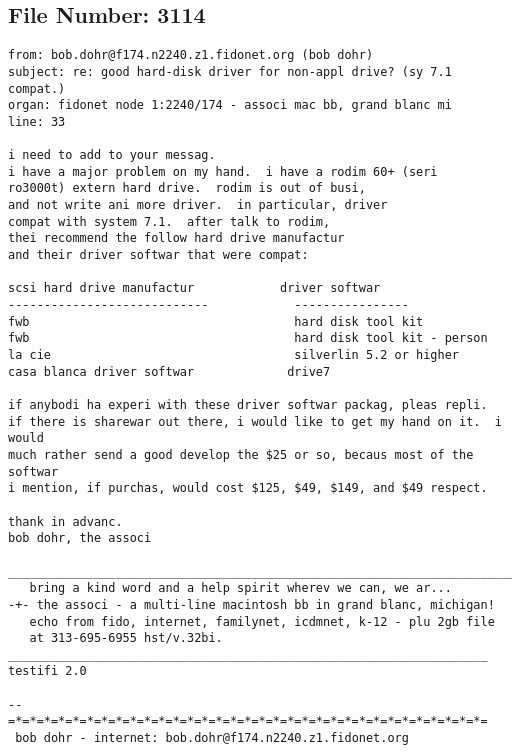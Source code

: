 \subsection{File Number: 3114}
\begin{verbatim}
from: bob.dohr@f174.n2240.z1.fidonet.org (bob dohr)
subject: re: good hard-disk driver for non-appl drive? (sy 7.1 compat.)
organ: fidonet node 1:2240/174 - associ mac bb, grand blanc mi
line: 33

i need to add to your messag.
i have a major problem on my hand.  i have a rodim 60+ (seri
ro3000t) extern hard drive.  rodim is out of busi, 
and not write ani more driver.  in particular, driver 
compat with system 7.1.  after talk to rodim, 
thei recommend the follow hard drive manufactur 
and their driver softwar that were compat:
 
scsi hard drive manufactur            driver softwar
----------------------------            ----------------
fwb                                     hard disk tool kit
fwb                                     hard disk tool kit - person
la cie                                  silverlin 5.2 or higher
casa blanca driver softwar             drive7
 
if anybodi ha experi with these driver softwar packag, pleas repli.
if there is sharewar out there, i would like to get my hand on it.  i would
much rather send a good develop the $25 or so, becaus most of the softwar
i mention, if purchas, would cost $125, $49, $149, and $49 respect.

thank in advanc.
bob dohr, the associ

_______________________________________________________________________________
   bring a kind word and a help spirit wherev we can, we ar...
-+- the associ - a multi-line macintosh bb in grand blanc, michigan!
   echo from fido, internet, familynet, icdmnet, k-12 - plu 2gb file
   at 313-695-6955 hst/v.32bi.
___________________________________________________________________ testifi 2.0

--  
=*=*=*=*=*=*=*=*=*=*=*=*=*=*=*=*=*=*=*=*=*=*=*=*=*=*=*=*=*=*=*=*=*=
 bob dohr - internet: bob.dohr@f174.n2240.z1.fidonet.org
\end{verbatim}
